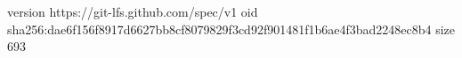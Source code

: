 version https://git-lfs.github.com/spec/v1
oid sha256:dae6f156f8917d6627bb8cf8079829f3cd92f901481f1b6ae4f3bad2248ec8b4
size 693
